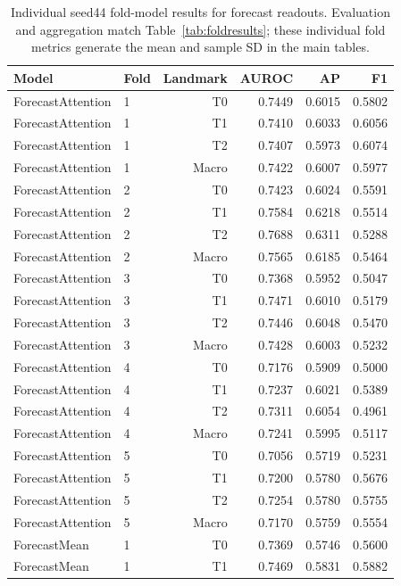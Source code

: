 \begin{table}[t]
\centering
\small
\caption{Individual seed44 fold-model results for forecast readouts. Evaluation and aggregation match Table~\ref{tab:foldresults}; these individual fold metrics generate the mean and sample SD in the main tables.}
\label{tab:foldresults_forecast}
\begin{tabular}{llrrrr}
\toprule
Model & Fold & Landmark & AUROC & AP & F1 \\
\midrule
ForecastAttention & 1 & T0 & 0.7449 & 0.6015 & 0.5802 \\
ForecastAttention & 1 & T1 & 0.7410 & 0.6033 & 0.6056 \\
ForecastAttention & 1 & T2 & 0.7407 & 0.5973 & 0.6074 \\
ForecastAttention & 1 & Macro & 0.7422 & 0.6007 & 0.5977 \\
ForecastAttention & 2 & T0 & 0.7423 & 0.6024 & 0.5591 \\
ForecastAttention & 2 & T1 & 0.7584 & 0.6218 & 0.5514 \\
ForecastAttention & 2 & T2 & 0.7688 & 0.6311 & 0.5288 \\
ForecastAttention & 2 & Macro & 0.7565 & 0.6185 & 0.5464 \\
ForecastAttention & 3 & T0 & 0.7368 & 0.5952 & 0.5047 \\
ForecastAttention & 3 & T1 & 0.7471 & 0.6010 & 0.5179 \\
ForecastAttention & 3 & T2 & 0.7446 & 0.6048 & 0.5470 \\
ForecastAttention & 3 & Macro & 0.7428 & 0.6003 & 0.5232 \\
ForecastAttention & 4 & T0 & 0.7176 & 0.5909 & 0.5000 \\
ForecastAttention & 4 & T1 & 0.7237 & 0.6021 & 0.5389 \\
ForecastAttention & 4 & T2 & 0.7311 & 0.6054 & 0.4961 \\
ForecastAttention & 4 & Macro & 0.7241 & 0.5995 & 0.5117 \\
ForecastAttention & 5 & T0 & 0.7056 & 0.5719 & 0.5231 \\
ForecastAttention & 5 & T1 & 0.7200 & 0.5780 & 0.5676 \\
ForecastAttention & 5 & T2 & 0.7254 & 0.5780 & 0.5755 \\
ForecastAttention & 5 & Macro & 0.7170 & 0.5759 & 0.5554 \\
ForecastMean & 1 & T0 & 0.7369 & 0.5746 & 0.5600 \\
ForecastMean & 1 & T1 & 0.7469 & 0.5831 & 0.5882 \\

\end{tabular}
\end{table}
